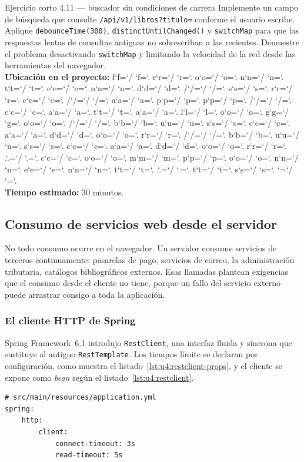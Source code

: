 \documentclass[11pt,a4paper,openany]{book}
\newcommand{\ruta}[1]{{\ttfamily\small\rutaaux #1\relax}}
\def\rutaaux{\futurelet\next\rutapaso}
\def\rutapaso{%
	\ifx\next\relax \let\sig\relax
	\else \let\sig\rutaimprime \fi \sig}
\def\rutaimprime#1{%
	#1\ifnum`#1=`/ \allowbreak\fi
	\ifnum`#1=`. \allowbreak\fi
	\rutaaux}
\begin{document}
\begin{cajaejercicio}{Ejercicio corto 4.11 --- buscador sin condiciones de carrera}
	Implemente un campo de búsqueda que consulte \texttt{/api/v1/libros?titulo=} conforme el usuario escribe. Aplique \texttt{debounceTime(300)}, \texttt{distinctUntilChanged()} y \texttt{switchMap} para que las respuestas lentas de consultas antiguas no sobrescriban a las recientes. Demuestre el problema desactivando \texttt{switchMap} y limitando la velocidad de la red desde las herramientas del navegador.\\[3pt]
	\textbf{Ubicación en el proyecto:} \ruta{frontend/src/app/catalogo/buscador/buscador.component.ts}\\[3pt]
	\textbf{Tiempo estimado:} 30 minutos.
\end{cajaejercicio}

\subsection{Consumo de servicios web desde el servidor}
\label{sec:u4:servidor}

No todo consumo ocurre en el navegador. Un servidor consume servicios de terceros continuamente: pasarelas de pago, servicios de correo, la administración tributaria, catálogos bibliográficos externos. Esas llamadas plantean exigencias que el consumo desde el cliente no tiene, porque un fallo del servicio externo puede arrastrar consigo a toda la aplicación.

\subsubsection{El cliente HTTP de Spring}

Spring Framework~6.1 introdujo \texttt{RestClient}, una interfaz fluida y síncrona que sustituye al antiguo \texttt{RestTemplate}. Los tiempos límite se declaran por configuración, como muestra el listado~\ref{lst:u4:restclient-props}, y el cliente se expone como \emph{bean} según el listado~\ref{lst:u4:restclient}.

\begin{lstlisting}[style=yaml,caption={Tiempos limite globales del cliente HTTP declarados por configuracion.},label={lst:u4:restclient-props}]
# src/main/resources/application.yml
spring:
	http:
		client:
			connect-timeout: 3s
			read-timeout: 5s
\end{lstlisting}
\end{document}
